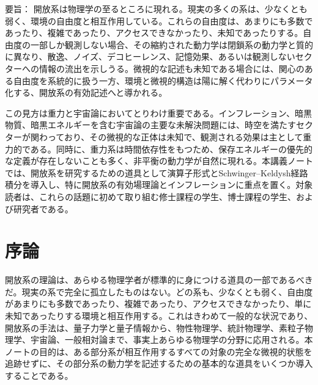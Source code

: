 \documentclass[a4paper,11pt,oneside]{article}
\theoremstyle{definition}
\numberwithin{equation}{section}
\begin{document}
\begin{titlepage}
\noindent
{\scshape 要旨：}
開放系は物理学の至るところに現れる。現実の多くの系は、少なくとも弱く、環境の自由度と相互作用している。これらの自由度は、あまりにも多数であったり、複雑であったり、アクセスできなかったり、未知であったりする。自由度の一部しか観測しない場合、その縮約された動力学は閉鎖系の動力学と質的に異なり、散逸、ノイズ、デコヒーレンス、記憶効果、あるいは観測しないセクターへの情報の流出を示しうる。微視的な記述も未知である場合には、関心のある自由度を系統的に扱う一方、環境と微視的構造は陽に解く代わりにパラメータ化する、開放系の有効記述へと導かれる。



この見方は重力と宇宙論においてとりわけ重要である。インフレーション、暗黒物質、暗黒エネルギーを含む宇宙論の主要な未解決問題には、時空を満たすセクターが関わっており、その微視的な正体は未知で、観測される効果は主として重力的である。同時に、重力系は時間依存性をもつため、保存エネルギーの優先的な定義が存在しないことも多く、非平衡の動力学が自然に現れる。本講義ノートでは、開放系を研究するための道具として演算子形式とSchwinger--Keldysh経路積分を導入し、特に開放系の有効場理論とインフレーションに重点を置く。対象読者は、これらの話題に初めて取り組む修士課程の学生、博士課程の学生、および研究者である。


\vfill


\end{titlepage}


\tableofcontents


 
 
 

\section*{序論}



開放系の理論は、あらゆる物理学者が標準的に身につける道具の一部であるべきだ。現実の系で完全に孤立したものはない。どの系も、少なくとも弱く、自由度があまりにも多数であったり、複雑であったり、アクセスできなかったり、単に未知であったりする環境と相互作用する。これはきわめて一般的な状況であり、開放系の手法は、量子力学と量子情報から、物性物理学、統計物理学、素粒子物理学、宇宙論、一般相対論まで、事実上あらゆる物理学の分野に応用される。本ノートの目的は、ある部分系が相互作用するすべての対象の完全な微視的状態を追跡せずに、その部分系の動力学を記述するための基本的な道具をいくつか導入することである。
\end{document}
